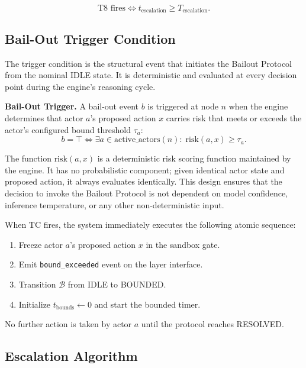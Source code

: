 \[
\text{T8 fires} \iff t_{\text{escalation}} \geq T_{\text{escalation}}. \tag{T8}
\]

\subsection{Bail-Out Trigger Condition}
\label{sec:trigger-condition}

The trigger condition is the structural event that initiates the Bailout Protocol from the nominal IDLE state. It is deterministic and evaluated at every decision point during the \bounds{} engine's reasoning cycle.

\begin{definition}
\textbf{Bail-Out Trigger.} A bail-out event $b$ is triggered at node $n$ when the \bounds{} engine determines that actor $a$'s proposed action $x$ carries risk that meets or exceeds the actor's configured bound threshold $\tau_a$:
\[
b = \top \iff \exists a \in \text{active\_actors}(n):\;
\text{risk}(a, x) \geq \tau_a.
\tag{TC}
\]
\end{definition}

The function $\text{risk}(a, x)$ is a deterministic risk scoring function maintained by the \bounds{} engine. It has no probabilistic component; given identical actor state and proposed action, it always evaluates identically. This design ensures that the decision to invoke the Bailout Protocol is not dependent on model confidence, inference temperature, or any other non-deterministic input.

When TC fires, the system immediately executes the following atomic sequence:
\begin{enumerate}
    \item Freeze actor $a$'s proposed action $x$ in the \bounds{} sandbox gate.
    \item Emit \texttt{bound\_exceeded} event on the \fact{} layer interface.
    \item Transition $\mathcal{B}$ from IDLE to BOUNDED.
    \item Initialize $t_{\text{bounds}} \leftarrow 0$ and start the bounded timer.
\end{enumerate}
No further action is taken by actor $a$ until the protocol reaches RESOLVED.

\subsection{Escalation Algorithm}
\label{sec:escalation-algorithm}

